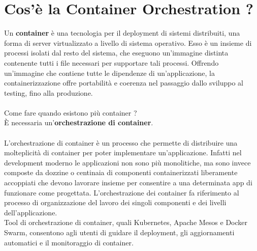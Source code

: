 \documentclass[12pt, a4paper]{report}
\begin{document}
\section{Cos'è la Container Orchestration ?}
Un \textbf{container} è una tecnologia per il deployment di sistemi distribuiti, una forma di server virtualizzato a livello di sistema operativo. Esso è un insieme di processi isolati dal resto del sistema, che eseguono un’immagine distinta contenente tutti i file necessari per supportare tali processi. Offrendo un’immagine che contiene tutte le dipendenze di un’applicazione, la containerizzazione offre portabilità e coerenza nel passaggio dallo sviluppo al testing, fino alla produzione.\\
\\
Come fare quando esistono più container ?\\È necessaria un'\textbf{orchestrazione di container}.\\
\\
L'orchestrazione di container è un processo che permette di distribuire una molteplicità di container per poter implementare un'applicazione. Infatti nel development moderno le applicazioni non sono più monolitiche, ma sono invece composte da dozzine o centinaia di componenti containerizzati liberamente accoppiati che devono lavorare insieme per consentire a una determinata app di funzionare come progettata. L'orchestrazione dei container fa riferimento al processo di organizzazione del lavoro dei singoli componenti e dei livelli dell'applicazione.\\
Tool di orchestrazione di container, quali Kubernetes, Apache Mesos e Docker Swarm, consentono agli utenti di guidare il deployment, gli aggiornamenti automatici e il monitoraggio di container.
\newpage
\end{document}

